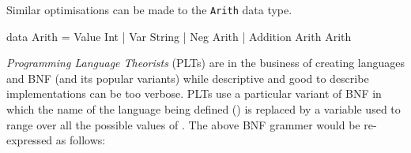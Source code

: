 \begin{bnf}
\end{bnf}

\noindent
Similar optimisations can be made to the \texttt{Arith} data type.

\begin{code}
data Arith = Value Int
           | Var String
           | Neg Arith
           | Addition Arith Arith
\end{code}

\noindent
\emph{Programming Language Theorists} (PLTs) are in the business of creating languages and BNF (and its popular variants) while descriptive and good to describe implementations can be too verbose.
PLTs use a particular variant of BNF in which the name of the language being defined (\allang{}) is replaced by a variable used to range over all the possible values of \allang{}.
The above BNF grammer would be re-expressed as follows:

\begin{bnf}
\end{bnf}

